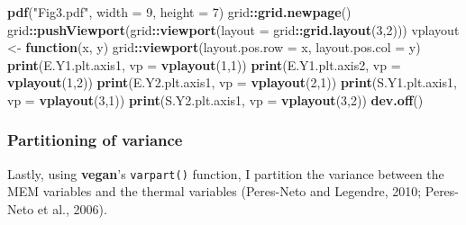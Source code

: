 \documentclass[10pt,A4,]{article}
\newenvironment{Shaded}{\begin{snugshade}}{\end{snugshade}}
\newcommand{\KeywordTok}[1]{\textcolor[rgb]{0.13,0.29,0.53}{\textbf{#1}}}
\newcommand{\DataTypeTok}[1]{\textcolor[rgb]{0.13,0.29,0.53}{#1}}
\newcommand{\DecValTok}[1]{\textcolor[rgb]{0.00,0.00,0.81}{#1}}
\newcommand{\StringTok}[1]{\textcolor[rgb]{0.31,0.60,0.02}{#1}}
\newcommand{\ControlFlowTok}[1]{\textcolor[rgb]{0.13,0.29,0.53}{\textbf{#1}}}
\newcommand{\OperatorTok}[1]{\textcolor[rgb]{0.81,0.36,0.00}{\textbf{#1}}}
\newcommand{\NormalTok}[1]{#1}
\begin{document}
\begin{Shaded}
\begin{Highlighting}[]
\KeywordTok{pdf}\NormalTok{(}\StringTok{"Fig3.pdf"}\NormalTok{, }\DataTypeTok{width =} \DecValTok{9}\NormalTok{, }\DataTypeTok{height =} \DecValTok{7}\NormalTok{)}
\NormalTok{grid}\OperatorTok{::}\KeywordTok{grid.newpage}\NormalTok{()}
\NormalTok{grid}\OperatorTok{::}\KeywordTok{pushViewport}\NormalTok{(grid}\OperatorTok{::}\KeywordTok{viewport}\NormalTok{(}\DataTypeTok{layout =}\NormalTok{ grid}\OperatorTok{::}\KeywordTok{grid.layout}\NormalTok{(}\DecValTok{3}\NormalTok{,}\DecValTok{2}\NormalTok{)))}
\NormalTok{vplayout <-}\StringTok{ }\ControlFlowTok{function}\NormalTok{(x, y) grid}\OperatorTok{::}\KeywordTok{viewport}\NormalTok{(}\DataTypeTok{layout.pos.row =}\NormalTok{ x, }\DataTypeTok{layout.pos.col =}\NormalTok{ y)}
\KeywordTok{print}\NormalTok{(E.Y1.plt.axis1, }\DataTypeTok{vp =} \KeywordTok{vplayout}\NormalTok{(}\DecValTok{1}\NormalTok{,}\DecValTok{1}\NormalTok{))}
\KeywordTok{print}\NormalTok{(E.Y1.plt.axis2, }\DataTypeTok{vp =} \KeywordTok{vplayout}\NormalTok{(}\DecValTok{1}\NormalTok{,}\DecValTok{2}\NormalTok{))}
\KeywordTok{print}\NormalTok{(E.Y2.plt.axis1, }\DataTypeTok{vp =} \KeywordTok{vplayout}\NormalTok{(}\DecValTok{2}\NormalTok{,}\DecValTok{1}\NormalTok{))}
\KeywordTok{print}\NormalTok{(S.Y1.plt.axis1, }\DataTypeTok{vp =} \KeywordTok{vplayout}\NormalTok{(}\DecValTok{3}\NormalTok{,}\DecValTok{1}\NormalTok{))}
\KeywordTok{print}\NormalTok{(S.Y2.plt.axis1, }\DataTypeTok{vp =} \KeywordTok{vplayout}\NormalTok{(}\DecValTok{3}\NormalTok{,}\DecValTok{2}\NormalTok{))}
\KeywordTok{dev.off}\NormalTok{()}
\end{Highlighting}
\end{Shaded}

\subsubsection*{Partitioning of variance}

Lastly, using \textbf{vegan}'s \texttt{varpart()} function, I partition
the variance between the MEM variables and the thermal variables
(Peres-Neto and Legendre, 2010; Peres-Neto et al., 2006).
\end{document}
